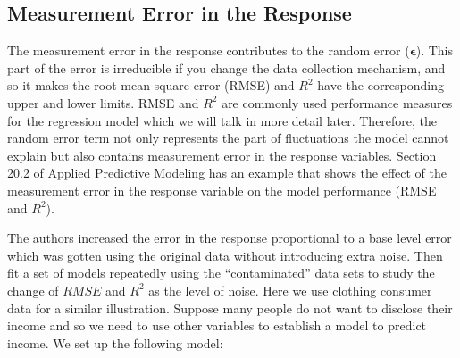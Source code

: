 \documentclass[12pt,]{krantz}
\newenvironment{Shaded}{\begin{snugshade}}{\end{snugshade}}
\newcommand{\KeywordTok}[1]{\textcolor[rgb]{0.13,0.29,0.53}{\textbf{#1}}}
\newcommand{\DataTypeTok}[1]{\textcolor[rgb]{0.13,0.29,0.53}{#1}}
\newcommand{\FloatTok}[1]{\textcolor[rgb]{0.00,0.00,0.81}{#1}}
\newcommand{\StringTok}[1]{\textcolor[rgb]{0.31,0.60,0.02}{#1}}
\newcommand{\CommentTok}[1]{\textcolor[rgb]{0.56,0.35,0.01}{\textit{#1}}}
\newcommand{\OperatorTok}[1]{\textcolor[rgb]{0.81,0.36,0.00}{\textbf{#1}}}
\newcommand{\NormalTok}[1]{#1}
\theoremstyle{definition}
\theoremstyle{definition}
\theoremstyle{definition}
\theoremstyle{remark}
\begin{document}
\subsection{Measurement Error in the
Response}\label{measurement-error-in-the-response}

The measurement error in the response contributes to the random error
(\(\mathbf{\epsilon}\)). This part of the error is irreducible if you
change the data collection mechanism, and so it makes the root mean
square error (RMSE) and \(R^2\) have the corresponding upper and lower
limits. RMSE and \(R^2\) are commonly used performance measures for the
regression model which we will talk in more detail later. Therefore, the
random error term not only represents the part of fluctuations the model
cannot explain but also contains measurement error in the response
variables. Section 20.2 of Applied Predictive Modeling \citep{APM} has
an example that shows the effect of the measurement error in the
response variable on the model performance (RMSE and \(R^2\)).

The authors increased the error in the response proportional to a base
level error which was gotten using the original data without introducing
extra noise. Then fit a set of models repeatedly using the
``contaminated'' data sets to study the change of \(RMSE\) and \(R^2\)
as the level of noise. Here we use clothing consumer data for a similar
illustration. Suppose many people do not want to disclose their income
and so we need to use other variables to establish a model to predict
income. We set up the following model:

\begin{Shaded}
\end{Shaded}
\end{document}
